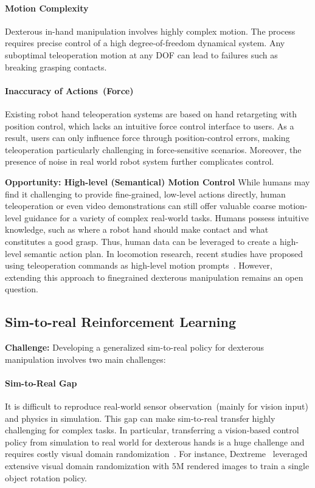 \paragraph{Motion Complexity} Dexterous in-hand manipulation involves highly complex motion. The process requires precise control of a high degree-of-freedom dynamical system. Any suboptimal teleoperation motion at any DOF can lead to failures such as breaking grasping contacts.

\paragraph{Inaccuracy of Actions~(Force)} Existing robot hand teleoperation systems are based on hand retargeting with position control, which lacks an intuitive force control interface to users. As a result, users can only influence force through position-control errors, making teleoperation particularly challenging in force-sensitive scenarios. Moreover, the presence of noise in real world robot system further complicates control.

\textbf{Opportunity: High-level (Semantical) Motion Control} While humans may find it challenging to provide fine-grained, low-level actions directly, human teleoperation or even video demonstrations can still offer valuable coarse motion-level guidance for a variety of complex real-world tasks. Humans possess intuitive knowledge, such as where a robot hand should make contact and what constitutes a good grasp. Thus, human data can be leveraged to create a high-level semantic action plan. In locomotion research, recent studies have proposed using teleoperation commands as high-level motion prompts~\cite{cheng2024expressive}. However, extending this approach to finegrained dexterous manipulation remains an open question.

\subsection{Sim-to-real Reinforcement Learning}
\textbf{Challenge:} Developing a generalized sim-to-real policy for dexterous manipulation involves two main challenges:
\paragraph{Sim-to-Real Gap} It is difficult to reproduce real-world sensor observation~(mainly for vision input) and physics in simulation. This gap can make sim-to-real transfer highly challenging for complex tasks. In particular, transferring a vision-based control policy from simulation to real world for dexterous hands is a huge challenge and requires costly visual domain randomization~\cite{tobin2017domain}. For instance, Dextreme~\cite{handa2023dextreme} leveraged extensive visual domain randomization with 5M rendered images to train a single object rotation policy.

